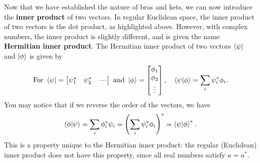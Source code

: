 \documentclass{article}
\begin{document}
\begin{tcolorbox}[arc=2mm, colback=magenta!15!white, colframe=magenta!80!black, title=\textsc{An Introduction to Complex Numbers (Enrichment)}]
   



    \vspace{1em}

    Now that we have established the nature of bras and kets, we can now introduce the \textbf{inner product} of two vectors. In regular Euclidean space, the inner product of two vectors is the dot product, as highlighted above. However, with complex numbers, the inner product is slightly different, and is given the name \textbf{Hermitian inner product}. The Hermitian inner product of two vectors $\bra{\psi}$ and $\ket{\phi}$ is given by
    \[
    \text{For }\bra{\psi} = \begin{bmatrix}
    \psi_1^* &
    \psi_2^* &
    \cdots
    \end{bmatrix}
    \text{ and }\ket{\phi} = \begin{bmatrix}
    \phi_1 \\
    \phi_2 \\
    \vdots
    \end{bmatrix},\quad 
    \braket{\psi}{\phi} = \sum_i \psi_i^* \phi_i.
    \]
    You may notice that if we reverse the order of the vectors, we have
    \[
    \braket{\phi}{\psi} = \sum_i \phi_i^* \psi_i = \left(\sum_i \psi_i^* \phi_i\right)^* = \braket{\psi}{\phi}^*.
    \]
    This is a property unique to the Hermitian inner product: the regular (Euclidean) inner product does not have this property, since all real numbers satisfy $a = a^*$.
\end{tcolorbox}
\end{document}
